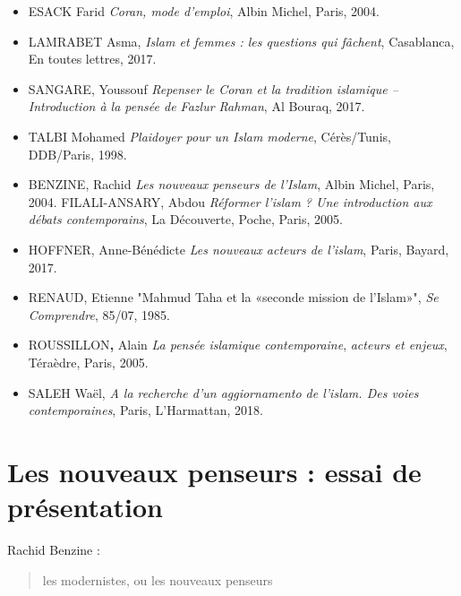 \begin{itemize}
\item
  
  ESACK Farid \emph{Coran, mode d'emploi}, Albin Michel, Paris, 2004.
  
\item
  
  LAMRABET Asma, \emph{Islam et femmes : les questions qui fâchent},
  Casablanca, En toutes lettres, 2017.
  
\item
  
  SANGARE, Youssouf \emph{Repenser le Coran et la tradition islamique --
  Introduction à la pensée de Fazlur Rahman}, Al Bouraq, 2017.
  
\item

  TALBI Mohamed \emph{Plaidoyer pour un Islam moderne}, Cérès/Tunis,
  DDB/Paris, 1998.
  

\item BENZINE, Rachid \emph{Les nouveaux penseurs de l'Islam}, Albin Michel,
Paris, 2004. FILALI-ANSARY, Abdou \emph{Réformer l'islam ? Une
introduction aux débats contemporains}, La
Découverte, Poche, Paris, 2005.

 \item HOFFNER, Anne-Bénédicte \emph{Les nouveaux acteurs de l'islam}, Paris,
Bayard, 2017.

\item RENAUD, Etienne "Mahmud Taha et la «seconde mission de l'Islam»",
\emph{Se Comprendre}, 85/07, 1985.

\item ROUSSILLON\textbf{,} Alain \emph{La pensée islamique contemporaine},
\emph{acteurs et enjeux}, Téraèdre, Paris, 2005.

\item SALEH Waël, \emph{A la recherche d'un aggiornamento de l'islam. Des
voies contemporaines}, Paris, L'Harmattan, 2018.

\end{itemize}



\section{Les nouveaux penseurs : essai
  de
  présentation}
  
  
Rachid Benzine : 
\begin{quote}
    les modernistes, ou les nouveaux penseurs
\end{quote}  

